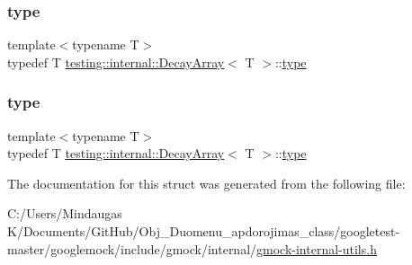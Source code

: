 \mbox{\label{structtesting_1_1internal_1_1_decay_array_a39803f9bafd56bc4531f86eb34fe9c0f}} 
\subsubsection{\texorpdfstring{type}{type}\hspace{0.1cm}{\footnotesize\ttfamily [2/3]}}
{\footnotesize\ttfamily template$<$typename T$>$ \\
typedef T \mbox{\hyperlink{structtesting_1_1internal_1_1_decay_array}{testing\+::internal\+::\+Decay\+Array}}$<$ T $>$\+::\mbox{\hyperlink{structtesting_1_1internal_1_1_decay_array_a39803f9bafd56bc4531f86eb34fe9c0f}{type}}}

\mbox{\label{structtesting_1_1internal_1_1_decay_array_a39803f9bafd56bc4531f86eb34fe9c0f}} 
\subsubsection{\texorpdfstring{type}{type}\hspace{0.1cm}{\footnotesize\ttfamily [3/3]}}
{\footnotesize\ttfamily template$<$typename T$>$ \\
typedef T \mbox{\hyperlink{structtesting_1_1internal_1_1_decay_array}{testing\+::internal\+::\+Decay\+Array}}$<$ T $>$\+::\mbox{\hyperlink{structtesting_1_1internal_1_1_decay_array_a39803f9bafd56bc4531f86eb34fe9c0f}{type}}}



The documentation for this struct was generated from the following file\+:\begin{DoxyCompactItemize}
\item 
C\+:/\+Users/\+Mindaugas K/\+Documents/\+Git\+Hub/\+Obj\+\_\+\+Duomenu\+\_\+apdorojimas\+\_\+class/googletest-\/master/googlemock/include/gmock/internal/\mbox{\hyperlink{googletest-master_2googlemock_2include_2gmock_2internal_2gmock-internal-utils_8h}{gmock-\/internal-\/utils.\+h}}\end{DoxyCompactItemize}
